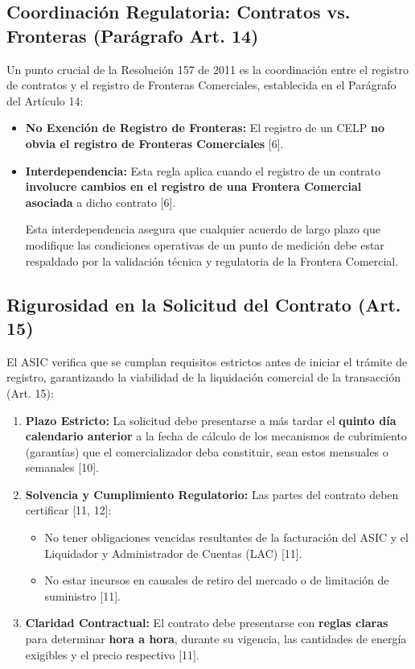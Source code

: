 \documentclass[a5paper]{book}%
\begin{document}
\subsection{Coordinación Regulatoria: Contratos vs. Fronteras (Parágrafo Art. 14)}

Un punto crucial de la Resolución 157 de 2011 es la coordinación entre el registro de contratos y el registro de Fronteras Comerciales, establecida en el Parágrafo del Artículo 14:

\begin{itemize}
	\item \textbf{No Exención de Registro de Fronteras:} El registro de un CELP \textbf{no obvia el registro de Fronteras Comerciales} [6].
	\item \textbf{Interdependencia:} Esta regla aplica cuando el registro de un contrato \textbf{involucre cambios en el registro de una Frontera Comercial asociada} a dicho contrato [6].
	
	Esta interdependencia asegura que cualquier acuerdo de largo plazo que modifique las condiciones operativas de un punto de medición debe estar respaldado por la validación técnica y regulatoria de la Frontera Comercial.
\end{itemize}

\subsection{Rigurosidad en la Solicitud del Contrato (Art. 15)}

El ASIC verifica que se cumplan requisitos estrictos antes de iniciar el trámite de registro, garantizando la viabilidad de la liquidación comercial de la transacción (Art. 15):

\begin{enumerate}
	\item \textbf{Plazo Estricto:} La solicitud debe presentarse a más tardar el \textbf{quinto día calendario anterior} a la fecha de cálculo de los mecanismos de cubrimiento (garantías) que el comercializador deba constituir, sean estos mensuales o semanales [10].
	\item \textbf{Solvencia y Cumplimiento Regulatorio:} Las partes del contrato deben certificar [11, 12]:
	\begin{itemize}
		\item No tener obligaciones vencidas resultantes de la facturación del ASIC y el Liquidador y Administrador de Cuentas (LAC) [11].
		\item No estar incursos en causales de retiro del mercado o de limitación de suministro [11].
	\end{itemize}
	\item \textbf{Claridad Contractual:} El contrato debe presentarse con \textbf{reglas claras} para determinar \textbf{hora a hora}, durante su vigencia, las cantidades de energía exigibles y el precio respectivo [11].
\end{enumerate}
\end{document}
